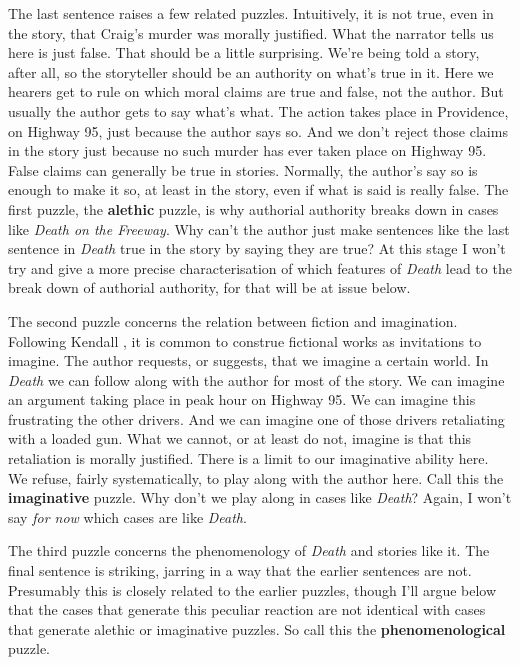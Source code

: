 \noindent The last sentence raises a few related puzzles. Intuitively, it is not true, even in the story, that Craig's murder was morally justified. What the narrator tells us here is just false. That should be a little surprising. We're being told a story, after all, so the storyteller should be an authority on what's true in it. Here we hearers get to rule on which moral claims are true and false, not the author. But usually the author gets to say what's what. The action takes place in Providence, on Highway 95, just because the author says so. And we don't reject those claims in the story just because no such murder has ever taken place on Highway 95. False claims can generally be true in stories. Normally, the author's say so is enough to make it so, at least in the story, even if what is said is really false. The first puzzle, the \textbf{alethic} puzzle, is why authorial authority breaks down in cases like \textit{Death on the Freeway}. Why can't the author just make sentences like the last sentence in \textit{Death} true in the story by saying they are true? At this stage I won't try and give a more precise characterisation of which features of \textit{Death} lead to the break down of authorial authority, for that will be at issue below.

The second puzzle concerns the relation between fiction and imagination. Following Kendall \citet{Walton1990}, it is common to construe fictional works as invitations to imagine. The author requests, or suggests, that we imagine a certain world. In \textit{Death} we can follow along with the author for most of the story. We can imagine an argument taking place in peak hour on Highway 95. We can imagine this frustrating the other drivers. And we can imagine one of those drivers retaliating with a loaded gun. What we cannot, or at least do not, imagine is that this retaliation is morally justified. There is a limit to our imaginative ability here. We refuse, fairly systematically, to play along with the author here. Call this the \textbf{imaginative} puzzle. Why don't we play along in cases like \textit{Death}? Again, I won't say \textit{for now} which cases are like \textit{Death}.

The third puzzle concerns the phenomenology of \textit{Death} and stories like it. The final sentence is striking, jarring in a way that the earlier sentences are not. Presumably this is closely related to the earlier puzzles, though I'll argue below that the cases that generate this peculiar reaction are not identical with cases that generate alethic or imaginative puzzles. So call this the \textbf{phenomenological} puzzle.

